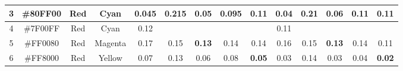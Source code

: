 \begin{table}[!htbp]
{\begin{tabular}{@{}cccccccccccccc@{}}
    \multicolumn{1}{c}{3}       & \multicolumn{1}{c}{\cellcolor[HTML]{80FF00}\#80FF00} & \multicolumn{1}{c|}{Red}     & \multicolumn{1}{c|}{Cyan}    & \multicolumn{1}{c|}{\cellcolor[HTML]{32CB00}\textbf{0.045}} & \multicolumn{1}{c|}{0.215}                                 & \multicolumn{1}{c|}{0.05}                                  & \multicolumn{1}{c|}{0.095} & \multicolumn{1}{c||}{0.11}                                  & \multicolumn{1}{c|}{\cellcolor[HTML]{32CB00}\textbf{0.04}} & \multicolumn{1}{c|}{0.21}                                  & \multicolumn{1}{c|}{0.06}                                  & \multicolumn{1}{c|}{0.11}                                  & \multicolumn{1}{c|}{0.11}                                  \\ \midrule
    \multicolumn{1}{c}{4}       & \multicolumn{1}{c}{\cellcolor[HTML]{7F00FF}\#7F00FF} & \multicolumn{1}{c|}{Red}     & \multicolumn{1}{c|}{Cyan}    & \multicolumn{1}{c|}{0.12}                                   & \multicolumn{4}{c||}{}                                                                                                                                                                                             & \multicolumn{1}{c|}{0.11}                                  & \multicolumn{4}{c|}{}                                                                                                                                                                                                                             \\ \midrule
    \multicolumn{1}{c}{5}       & \multicolumn{1}{c}{\cellcolor[HTML]{FF0080}\#FF0080} & \multicolumn{1}{c|}{Red}     & \multicolumn{1}{c|}{Magenta} & \multicolumn{1}{c|}{0.17}                                   & \multicolumn{1}{c|}{0.15}                                  & \multicolumn{1}{c|}{\cellcolor[HTML]{32CB00}\textbf{0.13}} & \multicolumn{1}{c|}{0.14}  & \multicolumn{1}{c||}{0.14}                                  & \multicolumn{1}{c|}{0.16}                                  & \multicolumn{1}{c|}{0.15}                                  & \multicolumn{1}{c|}{\cellcolor[HTML]{32CB00}\textbf{0.13}} & \multicolumn{1}{c|}{0.14}                                  & \multicolumn{1}{c|}{0.11}                                  \\ \midrule
    \multicolumn{1}{c}{6}       & \multicolumn{1}{c}{\cellcolor[HTML]{FF8000}\#FF8000} & \multicolumn{1}{c|}{Red}     & \multicolumn{1}{c|}{Yellow}  & \multicolumn{1}{c|}{0.07}                                   & \multicolumn{1}{c|}{0.13}                                  & \multicolumn{1}{c|}{0.06}                                  & \multicolumn{1}{c|}{0.08}  & \multicolumn{1}{c||}{\cellcolor[HTML]{32CB00}\textbf{0.05}} & \multicolumn{1}{c|}{0.03}                                  & \multicolumn{1}{c|}{0.14}                                  & \multicolumn{1}{c|}{0.03}                                  & \multicolumn{1}{c|}{0.04}                                  & \multicolumn{1}{c|}{\cellcolor[HTML]{32CB00}\textbf{0.02}} \\ \midrule

\end{tabular}}
\end{table}
